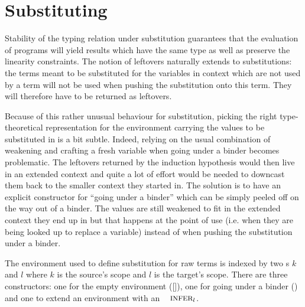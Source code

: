 \documentclass[a4paper,UKenglish]{lipics-v2016}
\begin{document}

\section{Substituting}\label{sec:substitution}

Stability of the typing relation under substitution guarantees
that the evaluation of programs will yield results which have
the same type as well as preserve the linearity constraints.
The notion of leftovers naturally extends to substitutions: the
terms meant to be substituted for the variables in context which
are not used by a term will not be used when pushing the substitution
onto this term. They will therefore have to be returned as leftovers.

Because of this rather unusual behaviour for substitution, picking
the right type-theoretical representation for the environment
carrying the values to be substituted in is a bit subtle. Indeed,
relying on the usual combination of weakening and crafting a fresh
variable when going under a binder becomes problematic. The leftovers
returned by the induction hypothesis would then live in an extended
context and quite a lot of effort would be needed to downcast them
back to the smaller context they started in. The solution is to have
an explicit constructor for ``going under a binder'' which can be
simply peeled off on the way out of a binder. The values are still
weakened to fit in the extended context they end up in but that happens
at the point of use (i.e. when they are being looked up to replace a
variable) instead of when pushing the substitution under a binder.

\begin{definition}The environment \Env{} used to define substitution
for raw terms is indexed by two \Nat{}s $k$ and $l$ where $k$ is the
source's scope and $l$ is the target's scope. There are three constructors:
one for the empty environment ([]), one for going under a binder (\envextend{})
and one to extend an environment with an $\Inferable{l}$.
\end{definition}
\end{document}
